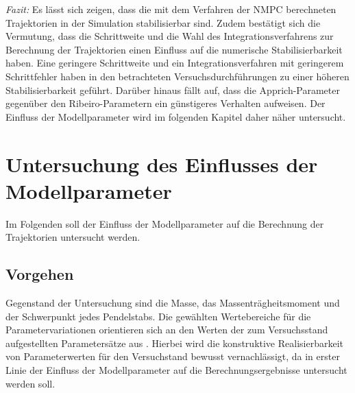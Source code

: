 \emph{Fazit:}
Es lässt sich zeigen, dass die mit dem Verfahren der NMPC berechneten Trajektorien in der Simulation stabilisierbar sind. Zudem bestätigt sich die Vermutung, dass die Schrittweite und die Wahl des Integrationsverfahrens zur Berechnung der Trajektorien einen Einfluss auf die numerische Stabilisierbarkeit haben. Eine geringere Schrittweite und ein Integrationsverfahren mit geringerem Schrittfehler haben in den betrachteten Versuchsdurchführungen zu einer höheren Stabilisierbarkeit geführt. Darüber hinaus fällt auf, dass die Apprich-Parameter gegenüber den Ribeiro-Parametern ein günstigeres Verhalten aufweisen. Der Einfluss der Modellparameter wird im folgenden Kapitel daher näher untersucht. 

\section{Untersuchung des Einflusses der Modellparameter}\label{sec:trjparamtest}

Im Folgenden soll der Einfluss der Modellparameter auf die Berechnung der Trajektorien untersucht werden.

\subsection{Vorgehen}

Gegenstand der Untersuchung sind die Masse, das Massenträgheitsmoment und der Schwerpunkt jedes Pendelstabs. Die gewählten Wertebereiche für die Parametervariationen orientieren sich an den Werten der zum Versuchsstand aufgestellten Parametersätze aus . Hierbei wird die konstruktive Realisierbarkeit von Parameterwerten für den Versuchstand bewusst vernachlässigt, da in erster Linie der Einfluss der Modellparameter auf die Berechnungsergebnisse untersucht werden soll.

